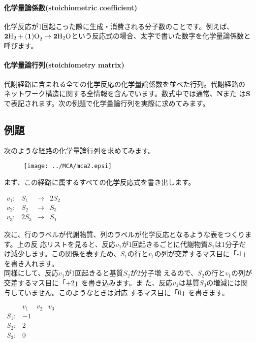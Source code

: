 \paragraph{化学量論係数(stoichiometric coefficient)}
化学反応が1回起こった際に生成・消費される分子数のことです。例えば、${\rm {\bf 2}H}_2 + {\rm ({\bf 1})O}_2 \rightarrow {\rm {\bf 2}H}_2{\rm O}$という反応式の場合、太字で書いた数字を化学量論係数と呼びます。\\

\paragraph{化学量論行列(stoichiometry matrix)}
代謝経路に含まれる全ての化学反応の化学量論係数を並べた行列。代謝経路の
ネットワーク構造に関する全情報を含んでいます。数式中では通常、{\bf N}また
は{\bf S}で表記されます。次の例題で化学量論行列を実際に求めてみます。


\subsection{例題}
次のような経路の化学量論行列を求めてみます。

\begin{figure}[h]
\begin{center}
\texttt{[image: ../MCA/mca2.epsi]}
\end{center}
\end{figure}

まず、この経路に属するすべての化学反応式を書き出します。\\

\begin{center}
\(
\begin{array}{lrcr}
v_1: & S_1 & \rightarrow & 2S_2 \\
v_2: & S_2 & \rightarrow & S_3 \\
v_3: & 2S_3 & \rightarrow & S_1 
\end{array}
\)
\end{center}

次に、行のラベルが代謝物質、列のラベルが化学反応となるような表をつくります。上の反
応リストを見ると、反応\(v_1\)が1回起きるごとに代謝物質\(S_1\)は1分子だけ減少します。この関係を表すため、\(S_1\)の行と\(v_1\)の列が交差するマス目に「-1」
を書き入れます。\\

\indent 同様にして、反応\(v_1\)が1回起きると基質\(S_2\)が2分子増
えるので、\(S_2\)の行と\(v_1\)の列が交差するマス目に「+2」を書き込みます。ま
た、反応\(v_1\)は基質\(S_3\)の増減には関与していません。このようなときは対応
するマス目に「0」を書きます。
\begin{center}
\(
\begin{array}{r|rrr}
     & v_1 & v_2 & v_3 \\
\hline
S_1: & -1  &   &  \\
S_2: &  2  &   &  \\
S_3: &  0  &   & \\ 
\end{array}
\)
\end{center}

